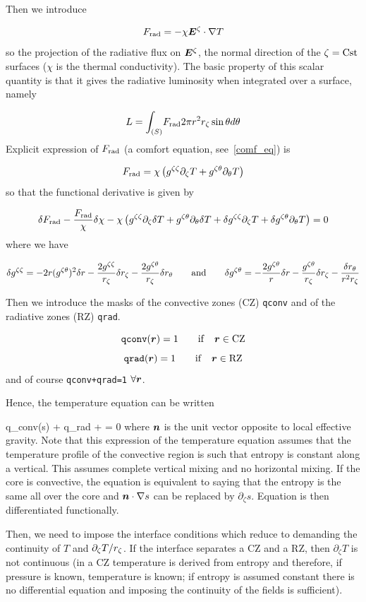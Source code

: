 Then we introduce

\[ \frad = -\chi\vE^\zeta\cdot\na T\]
so the projection of the radiative flux on $\vE^\zeta$, the normal
direction of the $\zeta={\rm Cst}$ surfaces ($\chi$ is the thermal
conductivity). The basic property of this
scalar quantity is that it gives the radiative luminosity when
integrated over a surface, namely

\[ L= \int_{(S)}\! F_{\rm rad} 2\pi r^2r_\zeta\sin\theta d\theta\]
Explicit expression of $F_{\rm rad}$  (a comfort equation, see~\ref{comf_eq}) is

\[ F_{\rm rad} = \chi\left(g^{\zeta\zeta}\partial_\zeta T + g^{\zeta\theta}\partial_\theta T \right)\]
so that the functional derivative is given by

\[ \delta F_{\rm rad} -\frac{F_{\rm rad}}{\chi}\delta\chi -\chi\left(
g^{\zeta\zeta}\partial_\zeta\delta T + g^{\zeta\theta}\partial_\theta\delta T +
\delta g^{\zeta\zeta}\partial_\zeta T + \delta g^{\zeta\theta}\partial_\theta T\right) = 0\]
where we have

\[ \delta g^{\zeta\zeta} = -2r(g^{\zeta\theta})^2\delta r -\frac{2g^{\zeta\zeta}}{r_\zeta}\delta r_\zeta
-\frac{2g^{\zeta\theta}}{r_\zeta}\delta r_\theta\qquad {\rm and}\qquad
\delta g^{\zeta\theta} = -\frac{2g^{\zeta\theta}}{r}\delta r -\frac{g^{\zeta\theta}}{r_\zeta}\delta r_\zeta
-\frac{\delta r_\theta}{r^2r_\zeta}\]

Then we introduce the masks of the convective zones (CZ) {\tt qconv} and
of the radiative zones (RZ) {\tt qrad}.

\[ {\tt qconv}(\vr) = 1 \qquad {\rm if}\quad \vr \in {\rm CZ}\]
\[ {\tt qrad}(\vr) = 1 \qquad {\rm if}\quad \vr \in {\rm RZ}\]
and of course {\tt qconv+qrad=1} $\forall \vr$.

Hence, the temperature equation can be written

\beq q_{\rm conv}(\vn\cdot\na s) +  q_{\rm rad}\lp{} + \Lambda\rho\frac{\eps_*}{\chi_*}\rp = 0
where $\vn$ is the unit vector opposite to local effective gravity. Note
that this expression of the temperature equation assumes that the
temperature profile of the convective region is such that entropy is
constant along a vertical. This assumes complete vertical mixing and no
horizontal mixing. If the core is convective, the equation is equivalent
to saying that the entropy is the same all over the core and
$\vn\cdot\na s$ can be replaced by $\partial_\zeta s$. Equation
 is then differentiated functionally.

Then, we need to impose the interface conditions which reduce to
demanding the continuity of $T$ and $\partial_\zeta T/r_\zeta$. If the
interface separates a CZ and a RZ, then $\partial_\zeta T$ is not
continuous (in a CZ temperature is derived from entropy and therefore,
if pressure is known, temperature is known; if entropy is assumed
constant there is no differential equation and imposing the continuity
of the fields is sufficient).

